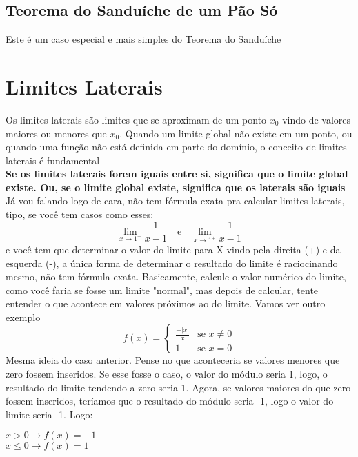 \documentclass{article}
\begin{document}
\subsection{Teorema do Sanduíche de um Pão Só}
Este é um caso especial e mais simples do Teorema do Sanduíche

\section{Limites Laterais}
Os limites laterais são limites que se aproximam de um ponto $x_{0}$ vindo de valores maiores ou menores que $x_{0}$. Quando um limite global não existe em um ponto, ou quando uma função não está definida em parte do domínio, o conceito de limites laterais é fundamental
\\[10pt]
\textbf{Se os limites laterais forem iguais entre si, significa que o limite global existe. Ou, se o limite global existe, significa que os laterais são iguais}
\\[10pt]
Já vou falando logo de cara, não tem fórmula exata pra calcular limites laterais, tipo, se você tem casos como esses:
\[
\lim_{x \to 1^-} \frac{1}{x - 1} \quad \text{e} \quad \lim_{x \to 1^+} \frac{1}{x - 1}
\]
e você tem que determinar o valor do limite para X vindo pela direita (+) e da esquerda (-), a única forma de determinar o resultado do limite é raciocinando mesmo, não tem fórmula exata. Basicamente, calcule o valor numérico do limite, como você faria se fosse um limite "normal", mas depois de calcular, tente entender o que acontece em valores próximos ao do limite. Vamos ver outro exemplo
\[
f(x) = 
\begin{cases} 
\frac{-|x|}{x} & \text{se } x \neq 0 \\
1 & \text{se } x = 0 
\end{cases}
\]
Mesma ideia do caso anterior. Pense no que aconteceria se valores menores que zero fossem inseridos. Se esse fosse o caso, o valor do módulo seria 1, logo, o resultado do limite tendendo a zero seria 1. Agora, se valores maiores do que zero fossem inseridos, teríamos que o resultado do módulo seria -1, logo o valor do limite seria -1. Logo:\\[10pt]
\begin{center}
$x > 0 \xrightarrow{} f(x) = -1$
\\[5pt]
$x \leq 0 \xrightarrow{} f(x) = 1$
\end{center}
\end{document}
